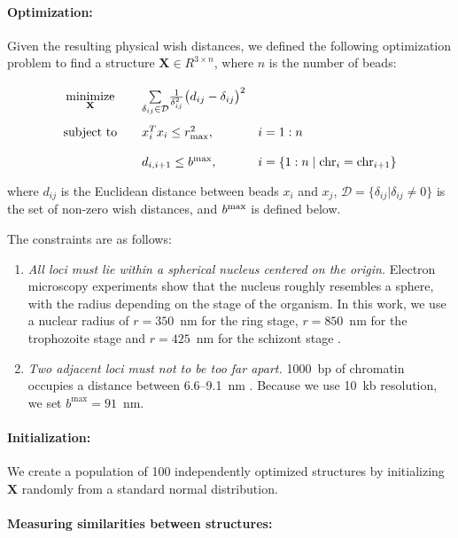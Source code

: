 \paragraph{Optimization: } Given the resulting physical wish distances, we
defined the following optimization problem to find a structure $\mathbf{X}
\in R^{3 \times n}$, where $n$ is the number of beads:
\begin{equation*}
\renewcommand{\arraystretch}{2}
\begin{array}{ccll}
\underset{\mathbf{X}}{\text{minimize}} & &
\underset{\delta_{ij} \in \mathcal{D}}{\sum} \frac{1}{\delta_{ij}^2}\big(d_{ij} - \delta_{ij}\big)^2 &\\
\text{subject to}
& & x_i^Tx_i \leq r_{\rm max}^2, \quad
& i = 1:n\\
& & d_{i, i+1} \leq b^{\rm max} , \quad
& i = \{1:n \;|\; {\rm chr}_i = {\rm chr}_{i+1}\}\\
\end{array}
\end{equation*}
where $d_{ij}$ is the Euclidean distance between beads $x_i$ and
$x_j$, $\mathcal{D} = \{ \delta_{ij} | \delta_{ij} \neq 0\}$ is
the set of non-zero wish distances, and $b^{\rm max}$ is defined below.

The constraints are as follows:
\begin{enumerate}
\item \emph{All loci must lie within a spherical nucleus centered on the origin. }
  Electron microscopy experiments show that the nucleus roughly resembles a
  sphere, with the radius depending on the stage of the organism.  In
  this work, we use a nuclear radius of $r = 350$~nm for the ring
  stage, $r=850$~nm for the trophozoite stage and $r=425$~nm for the
  schizont stage \citep{bannister:making, weiner:3d}.
\item \emph{Two adjacent loci must not to be too far apart.}
  1000~bp of chromatin occupies a distance between 6.6--9.1~nm
  \citep{berger:high}. Because we use 10~kb resolution, we set $b^\text{max} = 91$~nm.
\end{enumerate}

\paragraph{Initialization:}
We create a population of 100 independently optimized structures by initializing
$\textbf{X}$ randomly from a standard normal distribution.

\paragraph{Measuring similarities between structures:}

